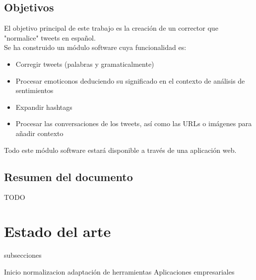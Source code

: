 \documentclass[14pt]{extarticle}
\theoremstyle{definition}
\theoremstyle{remark}
\begin{document}
\subsection{Objetivos}\label{sec:objetivos}
El objetivo principal de este trabajo es la creación de un corrector que "normalice" tweets en español.\\Se ha construido un módulo software cuya funcionalidad es:
\begin{itemize}
\item Corregir tweets (palabras y gramaticalmente)
\item Procesar emoticonos deduciendo su significado en el contexto de análisis de sentimientos
\item Expandir hashtags
\item Procesar las conversaciones de los tweets, así como las URLs o imágenes para añadir contexto
\end{itemize}
Todo este módulo software estará disponible a través de una aplicación web.

\subsection{Resumen del documento}\label{sec:resumen}
TODO

\section{Estado del arte}\label{sec:estadodelarte}
subsecciones

Inicio
normalizacion
adaptación de herramientas
Aplicaciones empresariales
\end{document}
